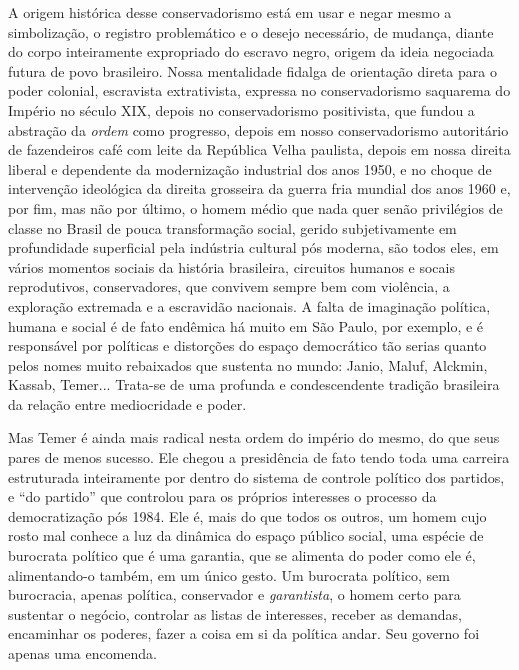 A origem histórica desse conservadorismo está em usar e negar mesmo a
simbolização, o registro problemático e o desejo necessário, de mudança,
diante do corpo inteiramente expropriado do escravo negro, origem da
ideia negociada futura de povo brasileiro. Nossa mentalidade fidalga de
orientação direta para o poder colonial, escravista extrativista,
expressa no conservadorismo saquarema do Império no século XIX, depois
no conservadorismo positivista, que fundou a abstração da \emph{ordem}
como progresso, depois em nosso conservadorismo autoritário de
fazendeiros café com leite da República Velha paulista, depois em nossa
direita liberal e dependente da modernização industrial dos anos 1950, e
no choque de intervenção ideológica da direita grosseira da guerra fria
mundial dos anos 1960 e, por fim, mas não por último, o homem médio que
nada quer senão privilégios de classe no Brasil de pouca transformação
social, gerido subjetivamente em profundidade superficial pela indústria
cultural pós moderna, são todos eles, em vários momentos sociais da
história brasileira, circuitos humanos e socais reprodutivos,
conservadores, que convivem sempre bem com violência, a exploração
extremada e a escravidão nacionais. A falta de imaginação política,
humana e social é de fato endêmica há muito em São Paulo, por exemplo, e
é responsável por políticas e distorções do espaço democrático tão
serias quanto pelos nomes muito rebaixados que sustenta no mundo: Janio,
Maluf, Alckmin, Kassab, Temer... Trata-se de uma profunda e
condescendente tradição brasileira da relação entre mediocridade e
poder.

Mas Temer é ainda mais radical nesta ordem do império do mesmo, do que
seus pares de menos sucesso. Ele chegou a presidência de fato tendo toda
uma carreira estruturada inteiramente por dentro do sistema de controle
político dos partidos, e ``do partido'' que controlou para os próprios
interesses o processo da democratização pós 1984. Ele é, mais do que
todos os outros, um homem cujo rosto mal conhece a luz da dinâmica do
espaço público social, uma espécie de burocrata político que é uma
garantia, que se alimenta do poder como ele é, alimentando-o também, em
um único gesto. Um burocrata político, sem burocracia, apenas política,
conservador e \emph{garantista}, o homem certo para sustentar o negócio,
controlar as listas de interesses, receber as demandas, encaminhar os
poderes, fazer a coisa em si da política andar. Seu governo foi apenas
uma encomenda.

